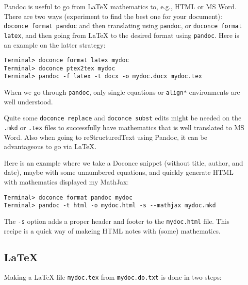 \documentclass[twoside]{article}
\begin{document}
Pandoc is useful to go from {\LaTeX} mathematics to, e.g., HTML or MS Word.
There are two ways (experiment to find the best one for your document):
{\fontsize{10pt}{10pt}\verb!doconce format pandoc!} and then translating using {\fontsize{10pt}{10pt}\verb!pandoc!}, or
{\fontsize{10pt}{10pt}\verb!doconce format latex!}, and then going from {\LaTeX} to the desired format
using {\fontsize{10pt}{10pt}\verb!pandoc!}.
Here is an example on the latter strategy:
\vspace{4pt}
\begin{Verbatim}[numbers=none,frame=lines,label=\fbox{{\tiny Terminal}},fontsize=\fontsize{9pt}{9pt},
labelposition=topline,framesep=2.5mm,framerule=0.7pt]
Terminal> doconce format latex mydoc
Terminal> doconce ptex2tex mydoc
Terminal> pandoc -f latex -t docx -o mydoc.docx mydoc.tex
\end{Verbatim}
When we go through {\fontsize{10pt}{10pt}\verb!pandoc!}, only single equations or {\fontsize{10pt}{10pt}\verb!align*!}
environments are well understood.

Quite some {\fontsize{10pt}{10pt}\verb!doconce replace!} and {\fontsize{10pt}{10pt}\verb!doconce subst!} edits might be needed
on the {\fontsize{10pt}{10pt}\verb!.mkd!} or {\fontsize{10pt}{10pt}\verb!.tex!} files to successfully have mathematics that is
well translated to MS Word.  Also when going to reStructuredText using
Pandoc, it can be advantageous to go via {\LaTeX}.

Here is an example where we take a Doconce snippet (without title, author,
and date), maybe with some unnumbered equations, and quickly generate
HTML with mathematics displayed my MathJax:
\vspace{4pt}
\begin{Verbatim}[numbers=none,frame=lines,label=\fbox{{\tiny Terminal}},fontsize=\fontsize{9pt}{9pt},
labelposition=topline,framesep=2.5mm,framerule=0.7pt]
Terminal> doconce format pandoc mydoc
Terminal> pandoc -t html -o mydoc.html -s --mathjax mydoc.mkd
\end{Verbatim}
The {\fontsize{10pt}{10pt}\verb!-s!} option adds a proper header and footer to the {\fontsize{10pt}{10pt}\verb!mydoc.html!} file.
This recipe is a quick way of makeing HTML notes with (some) mathematics.

\subsection{{\LaTeX}}

Making a {\LaTeX} file {\fontsize{10pt}{10pt}\verb!mydoc.tex!} from {\fontsize{10pt}{10pt}\verb!mydoc.do.txt!} is done in two steps:
\end{document}

